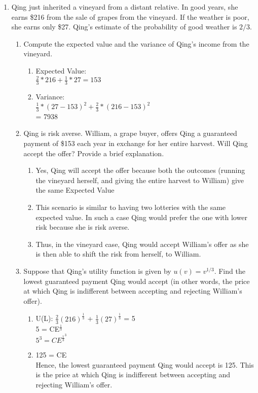\documentclass[11pt]{article}
\begin{document}
\begin{enumerate}
\begin{enumerate}
    \end{enumerate}

\item Qing just inherited a vineyard from a distant relative. In good years, she earns \$216 from the sale of grapes from the vineyard. If the weather is poor, she earns only \$27. Qing's estimate of the probability of good weather is $2/3$.
	\begin{enumerate}
	\item Compute the expected value and the variance of Qing's income from the vineyard.
	    \begin{enumerate}
	        \item Expected Value: \\
	        $\frac{2}{3}*216 + \frac{1}{3}*27 = 153$
	        \item Variance:\\
	        $\frac{1}{3}*(27-153)^2 + \frac{2}{3}*(216-153)^2$\\
	        = 7938
	    \end{enumerate}
	
	\item Qing is risk averse. William, a grape buyer, offers Qing a guaranteed payment of \$153 each year in exchange for her entire harvest. Will Qing accept the offer? Provide a brief explanation.
	    \begin{enumerate}
	        \item Yes, Qing will accept the offer because both the outcomes (running the vineyard herself, and giving the entire harvest to William) give the same Expected Value
	        \item This scenario is similar to having two lotteries with the same expected value. In such a case Qing would prefer the one with lower risk because she is risk averse.
	        \item Thus, in the vineyard case, Qing would accept William’s offer as she is then able to shift the risk from herself, to William.
	        
	    \end{enumerate}
	
	\item Suppose that Qing's utility function is given by $u(v)=v^{1/3}$. Find the lowest guaranteed payment Qing would accept (in other words, the price at which Qing is indifferent between accepting and rejecting William's offer).
	    \begin{enumerate}
	        \item U(L): $\frac{2}{3}(216)^\frac{1}{3}$ + $\frac{1}{3}(27)^\frac{1}{3}$ = 5 \\
	        5 = CE$^\frac{1}{3}$\\
	        $5^3 = CE^\frac{1}{3}^3$
	        \item 125 = CE\\
	        Hence, the lowest guaranteed payment Qing would accept is 125. This is the price at which Qing is indifferent between accepting and rejecting William's offer.
	    \end{enumerate}
    \end{enumerate}


\end{enumerate}
\end{document}
